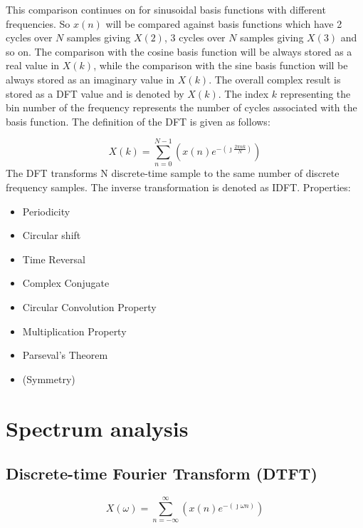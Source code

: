 \documentclass[10pt,english]{article}
\begin{document}
This comparison continues on for sinusoidal basis functions with different frequencies. So $x(n)$ will be compared against basis functions which have 2 cycles over $N$ samples giving $X(2)$, 3 cycles over $N$ samples giving $X(3)$ and so on. The comparison with the cosine basis function will be always stored as a real value in $X(k)$, while the comparison with the sine basis function will be always stored as an imaginary value in $X(k)$. The overall complex result is stored as a DFT value and is denoted by $X(k)$. The index $k$ representing the bin number of the frequency represents the number of cycles associated with the basis function. The definition of the DFT is given as follows:






\begin{equation}
X(k) = \sum_{n = 0}^{N-1} \left( x(n) e^{  - \left( \jmath \frac{2 \pi n k}{N} \right)} \right)
\end{equation}
The DFT transforms N discrete-time sample to the same number of discrete frequency samples. The inverse transformation is denoted as IDFT. Properties:
\begin{itemize}
\item Periodicity
\item Circular shift
\item Time Reversal 
\item Complex Conjugate
\item Circular Convolution Property
\item Multiplication Property
\item Parseval's Theorem
\item (Symmetry)
\end{itemize}


\section{Spectrum analysis}

\subsection{Discrete-time Fourier Transform (DTFT)}
\begin{equation}
X( \omega ) = \sum_{n = -\infty }^{\infty} \left( x(n) e^{ - \left( \jmath \omega n \right)} \right)
\end{equation}
\end{document}
